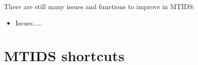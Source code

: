 \documentclass[a4paper,twoside, openright,12pt]{report}
\begin{document}
There are still many issues and functions to improve in MTIDS:
\begin{itemize}
 \item Issues.....
\end{itemize}

\chapter{MTIDS shortcuts}




\cleardoublepage
{} 
\listoffigures 	 %

% 
 \cleardoublepage
 
 


\end{document}
